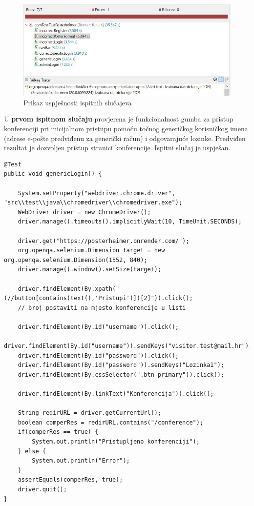 			\begin{figure} [hbt!]
				\includegraphics[width=\linewidth]{Slike/testResults}
				\caption{Prikaz uspješnosti ispitnih slučajeva}
			\end{figure}
			
			U \textbf{prvom ispitnom slučaju} provjerena je funkcionalnost gumba za pristup konferenciji pri inicijalnom pristupu pomoću točnog generičkog korisničkog imena (adrese e-pošte predviđenu za generički račun) i odgovarajuće lozinke. Predviđen rezultat je dozvoljen pristup stranici konferencije. Ispitni slučaj je uspješan.
			
			
			\begin{lstlisting}
@Test
public void genericLogin() {
	
	System.setProperty("webdriver.chrome.driver", "src\\test\\java\\chromedriver\\chromedriver.exe");
	WebDriver driver = new ChromeDriver();
	driver.manage().timeouts().implicitlyWait(10, TimeUnit.SECONDS);
	
	driver.get("https://posterheimer.onrender.com/");
	org.openqa.selenium.Dimension target = new  org.openqa.selenium.Dimension(1552, 840);
	driver.manage().window().setSize(target);
	
	driver.findElement(By.xpath("(//button[contains(text(),'Pristupi')])[2]")).click();
	// broj postaviti na mjesto konferencije u listi
	
	driver.findElement(By.id("username")).click();
	driver.findElement(By.id("username")).sendKeys("visitor.test@mail.hr");
	driver.findElement(By.id("password")).click();
	driver.findElement(By.id("password")).sendKeys("Lozinka1");
	driver.findElement(By.cssSelector(".btn-primary")).click();
	
	driver.findElement(By.linkText("Konferencija")).click();
	
	String redirURL = driver.getCurrentUrl();
	boolean comperRes = redirURL.contains("/conference");
	if(comperRes == true) {
		System.out.println("Pristupljeno konferenciji");
	} else {
		System.out.println("Error");
	}
	assertEquals(comperRes, true);
	driver.quit();
}
			\end{lstlisting}
			
